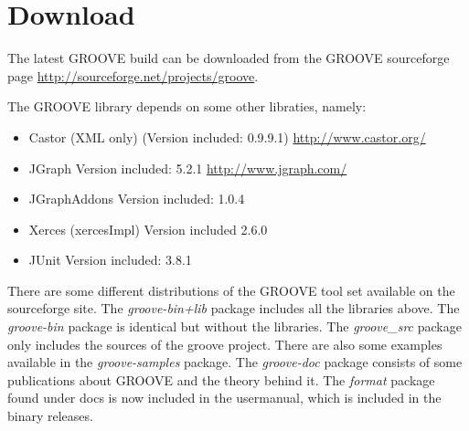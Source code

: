 \section{Download}

The latest GROOVE build can be downloaded from the GROOVE sourceforge page \url{http://sourceforge.net/projects/groove}.

The GROOVE library depends on some other libraties, namely:

\begin{itemize}\itemsep0pt
\item Castor (XML only) (Version included: 0.9.9.1) \url{http://www.castor.org/}
\item JGraph Version included: 5.2.1 \url{http://www.jgraph.com/}
\item JGraphAddons Version included: 1.0.4
\item Xerces (xercesImpl) Version included 2.6.0
\item JUnit Version included: 3.8.1
\end{itemize}

There are some different distributions of the GROOVE tool set available on the sourceforge site. The \emph{groove-bin+lib} package includes all the libraries above. The \emph{groove-bin} package is identical but without the libraries. The \emph{groove_src} package only includes the sources of the groove project. There are also some examples available in the \emph{groove-samples} package. The \emph{groove-doc} package consists of some publications about GROOVE and the theory behind it. The \emph{format} package found under docs is now included in the usermanual, which is included in the binary releases.
